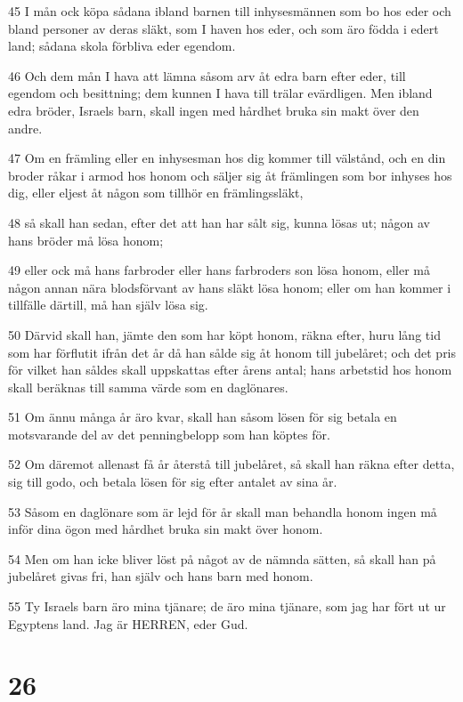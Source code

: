 \par 45 I mån ock köpa sådana ibland barnen till inhysesmännen som bo hos eder och bland personer av deras släkt, som I haven hos eder, och som äro födda i edert land; sådana skola förbliva eder egendom.
\par 46 Och dem mån I hava att lämna såsom arv åt edra barn efter eder, till egendom och besittning; dem kunnen I hava till trälar evärdligen. Men ibland edra bröder, Israels barn, skall ingen med hårdhet bruka sin makt över den andre.
\par 47 Om en främling eller en inhysesman hos dig kommer till välstånd, och en din broder råkar i armod hos honom och säljer sig åt främlingen som bor inhyses hos dig, eller eljest åt någon som tillhör en främlingssläkt,
\par 48 så skall han sedan, efter det att han har sålt sig, kunna lösas ut; någon av hans bröder må lösa honom;
\par 49 eller ock må hans farbroder eller hans farbroders son lösa honom, eller må någon annan nära blodsförvant av hans släkt lösa honom; eller om han kommer i tillfälle därtill, må han själv lösa sig.
\par 50 Därvid skall han, jämte den som har köpt honom, räkna efter, huru lång tid som har förflutit ifrån det år då han sålde sig åt honom till jubelåret; och det pris för vilket han såldes skall uppskattas efter årens antal; hans arbetstid hos honom skall beräknas till samma värde som en daglönares.
\par 51 Om ännu många år äro kvar, skall han såsom lösen för sig betala en motsvarande del av det penningbelopp som han köptes för.
\par 52 Om däremot allenast få år återstå till jubelåret, så skall han räkna efter detta, sig till godo, och betala lösen för sig efter antalet av sina år.
\par 53 Såsom en daglönare som är lejd för år skall man behandla honom ingen må inför dina ögon med hårdhet bruka sin makt över honom.
\par 54 Men om han icke bliver löst på något av de nämnda sätten, så skall han på jubelåret givas fri, han själv och hans barn med honom.
\par 55 Ty Israels barn äro mina tjänare; de äro mina tjänare, som jag har fört ut ur Egyptens land. Jag är HERREN, eder Gud.

\chapter{26}

